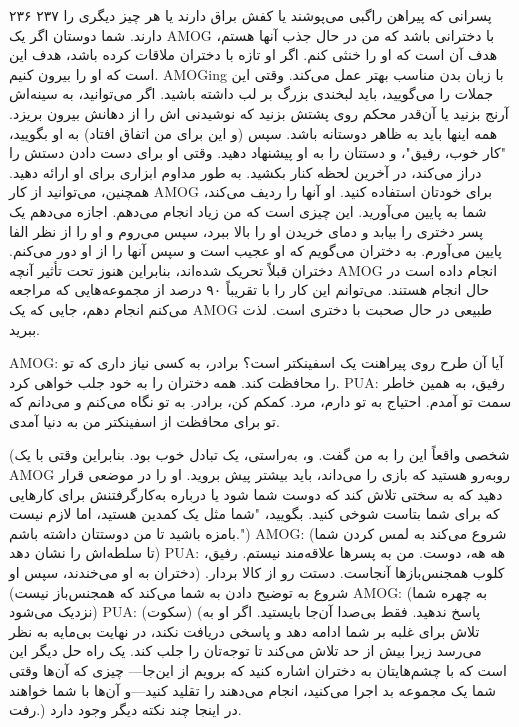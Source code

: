 ۲۳۶  
۲۳۷  
پسرانی که پیراهن راگبی می‌پوشند یا کفش براق دارند یا هر چیز دیگری را دارند. شما دوستان  
اگر یک AMOG با دخترانی باشد که من در حال جذب آنها هستم، هدف آن است که او را خنثی کنم. اگر  
او تازه با دختران ملاقات کرده باشد، هدف این است که او را بیرون کنیم.  
AMOGing با زبان بدن مناسب بهتر عمل می‌کند. وقتی این جملات را می‌گویید، باید لبخندی بزرگ بر لب داشته باشید. اگر می‌توانید، به سینه‌اش آرنج بزنید یا آن‌قدر محکم روی پشتش بزنید که نوشیدنی‌ اش را از دهانش بیرون بریزد.  
همه اینها باید به ظاهر دوستانه باشد. سپس (و این    
برای من اتفاق افتاد) به او بگویید، "کار خوب، رفیق"، و دستتان را به او پیشنهاد دهید. وقتی او برای دست دادن دستش را دراز می‌کند، در آخرین لحظه کنار بکشید. به طور مداوم ابزاری برای او ارائه دهید.  
همچنین، می‌توانید از کار AMOG برای خودتان استفاده کنید. او آنها را ردیف می‌کند، شما  
به پایین می‌آورید. این چیزی است که من زیاد انجام می‌دهم. اجازه می‌دهم یک پسر دختری را بیابد و  
دمای خریدن او را بالا ببرد، سپس می‌روم و او را از نظر الفا پایین می‌آورم. به دختران می‌گویم که او  
عجیب است و سپس آنها را از او دور می‌کنم. دختران قبلاً تحریک شده‌اند، بنابراین هنوز تحت تأثیر  
آنچه AMOG انجام داده است در حال انجام هستند. می‌توانم این کار را با تقریباً ۹۰ درصد از مجموعه‌هایی که  
مراجعه می‌کنم انجام دهم، جایی که یک AMOG طبیعی در حال صحبت با دختری است.  
لذت ببرید.

AMOG: آیا آن طرح روی پیراهنت یک اسفینکتر است؟ برادر، به کسی نیاز داری که تو را محافظت کند. همه دختران را به خود جلب خواهی کرد.  
PUA: رفیق، به همین خاطر سمت تو آمدم. احتیاج به تو دارم، مرد. کمکم کن، برادر. به تو نگاه می‌کنم و می‌دانم که تو برای محافظت از اسفینکتر من به دنیا آمدی.  

(شخصی واقعاً این را به من گفت. و، به‌راستی، یک تبادل خوب بود. بنابراین وقتی با یک AMOG روبه‌رو هستید که بازی را می‌داند، باید بیشتر پیش بروید. او را در موضعی قرار دهید که به سختی تلاش کند که دوست شما شود یا درباره به‌کار‌گرفتنش برای کارهایی که برای شما بتاست شوخی کنید. بگویید، "شما مثل یک کمدین هستید، اما لازم نیست بامزه باشید تا من دوستتان داشته باشم.")
AMOG: (شروع می‌کند به لمس کردن شما تا سلطه‌اش را نشان دهد)
PUA: هه هه، دوست. من به پسرها علاقه‌مند نیستم. رفیق، کلوب همجنس‌بازها آنجاست. دستت رو از کالا بردار.
(دختران به او می‌خندند، سپس او شروع به توضیح دادن به شما می‌کند که همجنس‌باز نیست)
AMOG: (به چهره شما نزدیک می‌شود)
PUA: (سکوت)
(پاسخ ندهید. فقط بی‌صدا آن‌جا بایستید. اگر او به تلاش برای غلبه بر شما ادامه دهد و پاسخی دریافت نکند، در نهایت بی‌مایه به نظر می‌رسد زیرا بیش از حد تلاش می‌کند تا توجه‌تان را جلب کند. یک راه حل دیگر این است که با چشم‌هایتان به دختران اشاره کنید که برویم از این‌جا— چیزی که آن‌ها وقتی شما یک مجموعه بد اجرا می‌کنید، انجام می‌دهند را تقلید کنید—و آن‌ها با شما خواهند رفت.)
در اینجا چند نکته دیگر وجود دارد.